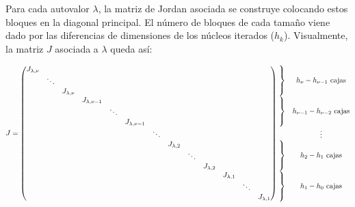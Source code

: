 Para cada autovalor $\lambda$, la matriz de Jordan asociada se construye colocando estos bloques en la diagonal principal. El número de bloques de cada tamaño viene dado por las diferencias de dimensiones de los núcleos iterados ($h_k$). Visualmente, la matriz $J$ asociada a $\lambda$ queda así:

\[
J = \begin{pmatrix}
    \begin{matrix} J_{\lambda,\nu} \\ & \ddots \\ & & J_{\lambda,\nu} \end{matrix} & & & & \\
    & \begin{matrix} J_{\lambda,\nu-1} \\ & \ddots \\ & & J_{\lambda,\nu-1} \end{matrix} & & & \\
    & & \ddots & & \\
    & & & \begin{matrix} J_{\lambda,2} \\ & \ddots \\ & & J_{\lambda,2} \end{matrix} & \\
    & & & & \begin{matrix} J_{\lambda,1} \\ & \ddots \\ & & J_{\lambda,1} \end{matrix}
\end{pmatrix}
\begin{matrix}
    \left.\begin{matrix} \vphantom{J_{\lambda,\nu}} \\ \vphantom{\ddots} \\ \vphantom{J_{\lambda,\nu}} \end{matrix}\right\} & h_\nu - h_{\nu-1} \text{ cajas} \\
    \left.\begin{matrix} \vphantom{J_{\lambda,\nu-1}} \\ \vphantom{\ddots} \\ \vphantom{J_{\lambda,\nu-1}} \end{matrix}\right\} & h_{\nu-1} - h_{\nu-2} \text{ cajas} \\
    \vphantom{\ddots} & \vdots \\
    \left.\begin{matrix} \vphantom{J_{\lambda,2}} \\ \vphantom{\ddots} \\ \vphantom{J_{\lambda,2}} \end{matrix}\right\} & h_2 - h_1 \text{ cajas} \\
    \left.\begin{matrix} \vphantom{J_{\lambda,1}} \\ \vphantom{\ddots} \\ \vphantom{J_{\lambda,1}} \end{matrix}\right\} & h_1 - h_0 \text{ cajas}
\end{matrix}
\]

